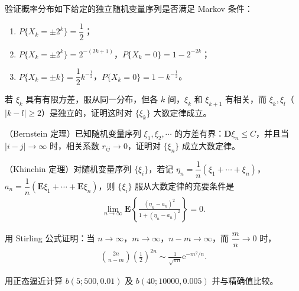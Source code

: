 \documentclass[../../main.tex]{subfiles}
\begin{document}
\begin{exercise}\label{exercise:ch05-06}
验证概率分布如下给定的独立随机变量序列是否满足 Markov 条件：
\begin{enumerate}
\item $P\{X_k=\pm2^{k}\}=\dfrac12$；
\item $P\{X_k=\pm2^{k}\}=2^{-(2k+1)}$，$P\{X_k=0\}=1-2^{-2k}$；
\item $P\{X_k=\pm k\}=\dfrac12k^{-\frac12}$，$P\{X_k=0\}=1-k^{-\frac12}$。
\end{enumerate}
\end{exercise}

\begin{exercise}\label{exercise:ch05-07}
若 $\xi_k$ 具有有限方差，服从同一分布，但各 $k$ 间，$\xi_k$ 和 $\xi_{k+1}$ 有相关，而 $\xi_k,\xi_l$（$|k-l|\geqslant2$）是独立的，证明这时对 $\{\xi_k\}$ 大数定律成立。
\end{exercise}

\begin{exercise}\label{exercise:ch05-08}
（Bernstein 定理）已知随机变量序列 $\xi_1,\xi_2,\cdots$ 的方差有界：$\boldsymbol{D}\xi_n\leqslant C$，并且当 $|i-j|\to\infty$ 时，相关系数 $r_{ij}\to0$，证明对 $\{\xi_n\}$ 成立大数定律。
\end{exercise}

\begin{exercise}\label{exercise:ch05-09}
（Khinchin 定理）对随机变量序列 $\{\xi_i\}$，若记 $\eta_n=\dfrac1n(\xi_1+\cdots+\xi_n)$，$a_n=\dfrac1n(\boldsymbol{E}\xi_1+\cdots+\boldsymbol{E}\xi_n)$，则 $\{\xi_i\}$ 服从大数定律的充要条件是
\begin{align*}
\lim_{n\to\infty}\boldsymbol{E}\left\{\frac{(\eta_n-a_n)^{2}}{1+(\eta_n-a_n)^{2}}\right\}=0.
\end{align*}
\end{exercise}

\begin{exercise}\label{exercise:ch05-10}
用 Stirling 公式证明：当 $n\to\infty$，$m\to\infty$，$n-m\to\infty$，而 $\dfrac{m}{n}\to0$ 时，
\begin{align*}
\binom{2n}{n-m}\left(\frac12\right)^{2n}\sim\frac{1}{\sqrt{\pi n}}\mathrm{e}^{-m^{2}/n}.
\end{align*}
\end{exercise}

\begin{exercise}\label{exercise:ch05-11}
用正态逼近计算 $b(5;500,0.01)$ 及 $b(40;10000,0.005)$ 并与精确值比较。
\end{exercise}
\end{document}
